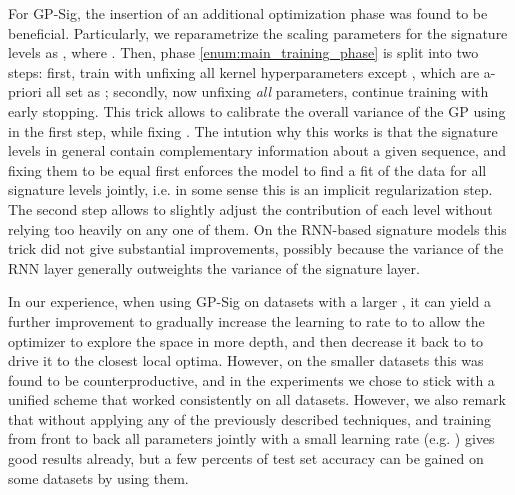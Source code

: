 \documentclass{article}
\begin{document}
For GP-Sig, the insertion of an additional optimization phase was found to be beneficial. Particularly, we reparametrize the scaling parameters for the signature levels  as , where . Then, phase \ref{enum:main_training_phase} is split into two steps: first, train with unfixing all kernel hyperparameters except , which are a-priori all set as ; secondly, now unfixing \emph{all} parameters, continue training with early stopping. This trick allows to calibrate the overall variance of the GP using  in the first step, while fixing . The intution why this works is that the signature levels in general contain complementary information about a given sequence, and fixing them to be equal first enforces the model to find a fit of the data for all signature levels jointly, i.e. in some sense this is an implicit regularization step. The second step allows to slightly adjust the contribution of each level without relying too heavily on any one of them. On the RNN-based signature models this trick did not give substantial improvements, possibly because the variance of the RNN layer generally outweights the variance of the signature layer.

In our experience, when using GP-Sig on datasets with a larger , it can yield a further improvement to gradually increase the learning to rate to  to allow the optimizer to explore the space in more depth, and then decrease it back to  to drive it to the closest local optima. However, on the smaller datasets this was found to be counterproductive, and in the experiments we chose to stick with a unified scheme that worked consistently on all datasets. However, we also remark that without applying any of the previously described techniques, and training from front to back all parameters jointly with a small learning rate (e.g. ) gives good results already, but a few percents of test set accuracy can be gained on some datasets by using them.
\end{document}
